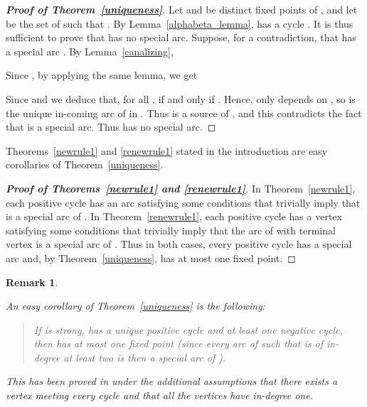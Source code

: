 \documentclass[11pt,a4paper]{article}
\newtheorem{remark}{Remark}
\begin{document}
\begin{proof}[{\bf Proof of Theorem~\ref{uniqueness}}]
Let  and  be distinct fixed points of , and let  be the set of  such that . By Lemma~\ref{alphabeta_lemma},  has a cycle . It is thus sufficient to prove that  has no special arc. Suppose, for a contradiction, that  has a special arc . By Lemma~\ref{canalizing}, 

Since , by applying the same lemma, we get 

Since  and  we deduce that, for all ,  if and only if . Hence,  only depends on , so  is the unique in-coming arc of  in . Thus  is a source of , and this contradicts the fact that  is a special arc. Thus  has no special arc. 
\end{proof}

Theorems~\ref{newrule1} and \ref{renewrule1} stated in the introduction are easy corollaries of Theorem~\ref{uniqueness}.

\begin{proof}[{\bf Proof of Theorems~\ref{newrule1} and  \ref{renewrule1}}] 
In Theorem~\ref{newrule1}, each positive cycle  has an arc  satisfying some conditions that trivially imply that  is a special arc of . In Theorem~\ref{renewrule1}, each positive cycle  has a vertex  satisfying some conditions that trivially imply that the arc  of  with terminal vertex  is a special arc of . Thus in both cases, every positive cycle has a special arc and, by Theorem~\ref{uniqueness},  has at most one fixed point. 
\end{proof}

\begin{remark}\label{rem:DR1}
{\em An easy corollary of Theorem~\ref{uniqueness} is the following: 
\begin{quote}
{\em If  is strong, has a unique positive cycle  and at least one negative cycle, then  has at most one fixed point} (since every arc  of  such that  is of in-degree at least two is then a special arc of ).
\end{quote}
This has been proved in \cite{DR12} under the additional assumptions that there exists a vertex  meeting every cycle and that all the vertices  have in-degree one.}
\end{remark}
\end{document}
